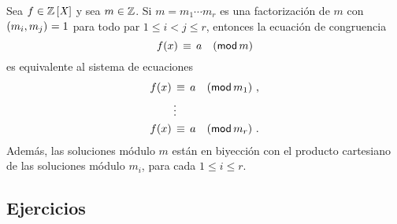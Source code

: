 \begin{coroChino}\label{coro:chino:varios:coro}
	Sea $f\in\polinomios\Enteros$ y sea $m\in\Enteros$.
	Si $m=m_1\cdots m_r$ es una factorizaci\'on de $m$ con
	$\mcd{m_i,m_j}=1$ para todo par $1\leq i<j\leq r$, entonces
	la ecuaci\'on de congruencia
	\begin{displaymath}
		f(x)\,\equiv\, a\modulo[m]
	\end{displaymath}
	es equivalente al sistema de ecuaciones
	\begin{displaymath}
		\begin{aligned}
			f(x) & \,\equiv\, a\modulo[m_1] \dispcomma \\
			& \vdots \\
			f(x) & \,\equiv\, a\modulo[m_r] \dispstop
		\end{aligned}
	\end{displaymath}
	Adem\'as, las soluciones m\'odulo $m$ est\'an en biyecci\'on
	con el producto cartesiano de las soluciones m\'odulo $m_i$,
	para cada $1\leq i\leq r$.
\end{coroChino}

\subsection*{Ejercicios}


